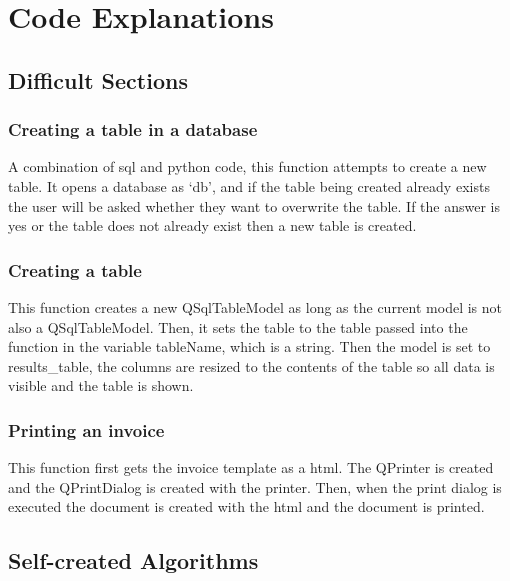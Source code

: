 \section{Code Explanations}

\subsection{Difficult Sections}

\subsubsection{Creating a table in a database}

A combination of sql and python code, this function attempts to create a new table. It opens a database as `db', and if the table being created already exists the user will be asked whether they want to overwrite the table. If the answer is yes or the table does not already exist then a new table is created. 

\subsubsection{Creating a table}

This function creates a new QSqlTableModel as long as the current model is not also a QSqlTableModel. Then, it sets the table to the table passed into the function in the variable tableName, which is a string. Then the model is set to results\_table, the columns are resized to the contents of the table so all data is visible and the table is shown.

\subsubsection{Printing an invoice}

This function first gets the invoice template as a html. The QPrinter is created and the QPrintDialog is created with the printer.  Then, when the print dialog is executed the document is created with the html and the document is printed.

\subsection{Self-created Algorithms}

